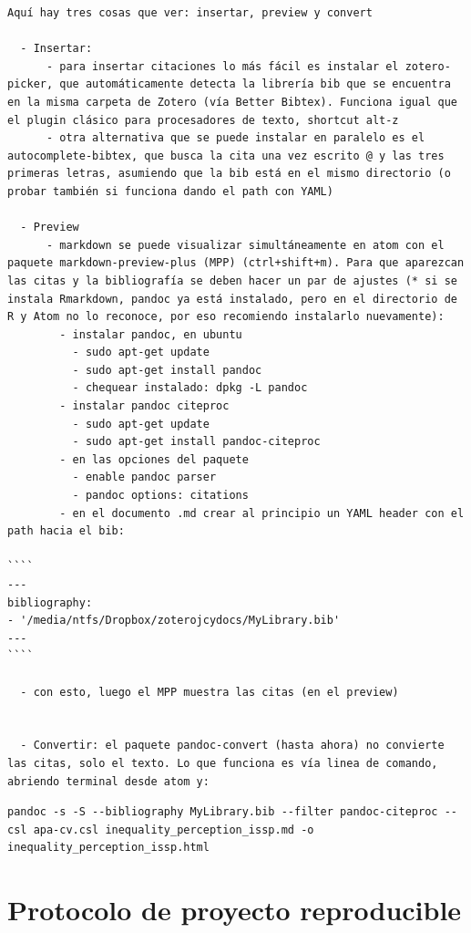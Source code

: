 \documentclass[
  11pt,
]{book}
\begin{document}
\begin{verbatim}
Aquí hay tres cosas que ver: insertar, preview y convert

  - Insertar:
      - para insertar citaciones lo más fácil es instalar el zotero-picker, que automáticamente detecta la librería bib que se encuentra en la misma carpeta de Zotero (vía Better Bibtex). Funciona igual que el plugin clásico para procesadores de texto, shortcut alt-z
      - otra alternativa que se puede instalar en paralelo es el autocomplete-bibtex, que busca la cita una vez escrito @ y las tres primeras letras, asumiendo que la bib está en el mismo directorio (o probar también si funciona dando el path con YAML)

  - Preview
      - markdown se puede visualizar simultáneamente en atom con el paquete markdown-preview-plus (MPP) (ctrl+shift+m). Para que aparezcan las citas y la bibliografía se deben hacer un par de ajustes (* si se instala Rmarkdown, pandoc ya está instalado, pero en el directorio de R y Atom no lo reconoce, por eso recomiendo instalarlo nuevamente):
        - instalar pandoc, en ubuntu
          - sudo apt-get update
          - sudo apt-get install pandoc
          - chequear instalado: dpkg -L pandoc
        - instalar pandoc citeproc
          - sudo apt-get update
          - sudo apt-get install pandoc-citeproc
        - en las opciones del paquete
          - enable pandoc parser
          - pandoc options: citations
        - en el documento .md crear al principio un YAML header con el path hacia el bib:

````
---
bibliography:
- '/media/ntfs/Dropbox/zoterojcydocs/MyLibrary.bib'
---
````

  - con esto, luego el MPP muestra las citas (en el preview)


  - Convertir: el paquete pandoc-convert (hasta ahora) no convierte las citas, solo el texto. Lo que funciona es vía linea de comando, abriendo terminal desde atom y:
\end{verbatim}

\begin{verbatim}
pandoc -s -S --bibliography MyLibrary.bib --filter pandoc-citeproc --csl apa-cv.csl inequality_perception_issp.md -o inequality_perception_issp.html
\end{verbatim}

\hypertarget{protocolo-de-proyecto-reproducible}{%
\chapter{Protocolo de proyecto reproducible}\label{protocolo-de-proyecto-reproducible}}
\end{document}
